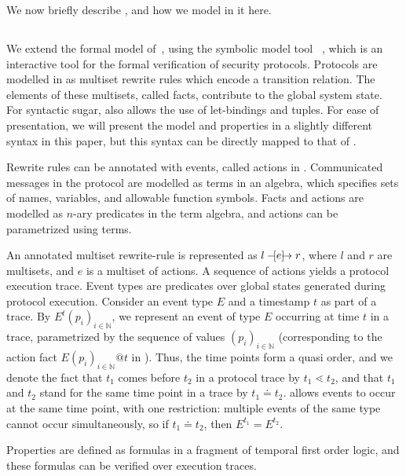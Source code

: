 We now briefly describe \mTamarin{}, and how we model \mEdhoc{} in it here.
%

\subsection{\mTamarin{}}
\label{sec:tamarin}
We extend the formal \mEdhoc{} model of~\cite{Norr21}, using the symbolic
model tool \mTamarin{}~\cite{DBLP:conf/cav/MeierSCB13}, which is an interactive
tool for the formal verification of security protocols.
%
Protocols are modelled in \mTamarin{} as multiset rewrite rules which encode a
transition relation.
%
The elements of these multisets, called facts, contribute to the global
system state.
%
For syntactic sugar, \mTamarin{} also allows the use of let-bindings and tuples.
%
For ease of presentation, we will present the model and properties in a
slightly different syntax in this paper, but this syntax can be directly
mapped to that of \mTamarin.
%

Rewrite rules can be annotated with events, called actions in \mTamarin{}.
%
Communicated messages in the protocol are modelled as terms in an algebra,
which specifies sets of names, variables, and allowable function symbols.
%
Facts and actions are modelled as $n$-ary predicates in the term algebra,
and actions can be parametrized using terms.
%

An annotated multiset rewrite-rule is represented as
$l \ifarrow[e] r$, where $l$ and $r$ are multisets, and $e$ is
a multiset of actions.
%
A sequence of actions yields a protocol execution trace.
%
Event types are predicates over global states generated during protocol execution.
%
Consider an event type $E$ and a timestamp $t$ as part of a trace.
%
By $E^{t}(p_i)_{i\in\mathbb{N}}$, we represent an event of type $E$ occurring
at time $t$ in a trace, parametrized by the sequence of values
$(p_i)_{i\in\mathbb{N}}$
(corresponding to the action fact $E(p_i)_{i\in\mathbb{N}}@t$ in \mTamarin).
%
Thus, the time points form a quasi order, and we denote the fact that
$t_{1}$ comes before $t_{2}$ in a protocol trace by
$t_{1} \lessdot t_{2}$, and that $t_{1}$ and $t_{2}$ stand for the same
time point in a trace by $t_{1} \doteq t_{2}$.
%
\mTamarin{} allows events to occur at the same time point, with one
restriction: multiple events of the same type cannot occur simultaneously,
so if $t_{1} \doteq t_{2}$, then $E^{t_{1}} = E^{t_{2}}$.
%

Properties are defined as formulas in a fragment of temporal first order logic,
and these formulas can be verified over execution traces.
%

